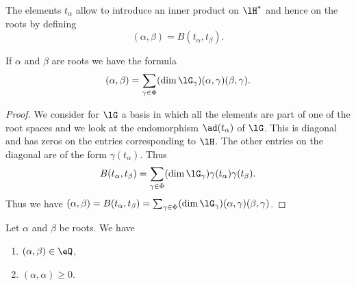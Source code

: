 The elements \( t_{\alpha}\) allow to introduce an inner product on \( \lH^*\) and hence on the roots by defining
\begin{equation}
    (\alpha,\beta)=B(t_{\alpha},t_{\beta}).
\end{equation}

\begin{lemma}       \label{Leminnerabequaaggb}
    If \( \alpha\) and \( \beta\) are roots we have the formula
    \begin{equation}
        (\alpha,\beta)=\sum_{\gamma\in\Phi}(\dim\lG_{\gamma})(\alpha,\gamma)(\beta,\gamma).
    \end{equation}
\end{lemma}

\begin{proof}
    We consider for \( \lG\) a basis in which all the elements are part of one of the root spaces and we look at the endomorphism \( \ad(t_{\alpha})\) of \( \lG\). This is diagonal and has zeros on the entries corresponding to \( \lH\). The other entries on the diagonal are of the form \( \gamma(t_{\alpha})\). Thus
    \begin{equation}
        B(t_{\alpha},t_{\beta})=\sum_{\gamma\in\Phi}(\dim\lG_{\gamma})\gamma(t_{\alpha})\gamma(t_{\beta}).
    \end{equation}
    Thus we have \( (\alpha,\beta)=B(t_{\alpha},t_{\beta})=\sum_{\gamma\in\Phi}(\dim\lG_{\gamma})(\alpha,\gamma)(\beta,\gamma)\).
\end{proof}

\begin{proposition}     \label{PropScalrooTsQ}
    Let \( \alpha\) and \( \beta\) be roots. We have
    \begin{enumerate}
        \item
            \( (\alpha,\beta)\in\eQ\),
        \item
            \( (\alpha,\alpha)\geq 0\).
    \end{enumerate}
\end{proposition}

